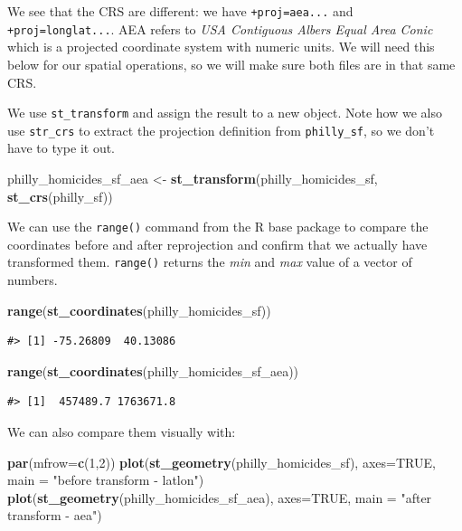 \documentclass[
]{book}
\newenvironment{Shaded}{\begin{snugshade}}{\end{snugshade}}
\newcommand{\AttributeTok}[1]{\textcolor[rgb]{0.13,0.29,0.53}{#1}}
\newcommand{\ConstantTok}[1]{\textcolor[rgb]{0.56,0.35,0.01}{#1}}
\newcommand{\DecValTok}[1]{\textcolor[rgb]{0.00,0.00,0.81}{#1}}
\newcommand{\FunctionTok}[1]{\textcolor[rgb]{0.13,0.29,0.53}{\textbf{#1}}}
\newcommand{\NormalTok}[1]{#1}
\newcommand{\OtherTok}[1]{\textcolor[rgb]{0.56,0.35,0.01}{#1}}
\newcommand{\StringTok}[1]{\textcolor[rgb]{0.31,0.60,0.02}{#1}}
\begin{document}
We see that the CRS are different: we have \texttt{+proj=aea...} and \texttt{+proj=longlat...}. AEA refers to \emph{USA Contiguous Albers Equal Area Conic} which is a projected coordinate system with numeric units. We will need this below for our spatial operations, so we will make sure both files are in that same CRS.

We use \texttt{st\_transform} and assign the result to a new object. Note how we also use \texttt{str\_crs} to extract the projection definition from \texttt{philly\_sf}, so we don't have to type it out.

\begin{Shaded}
\begin{Highlighting}[]
\NormalTok{philly\_homicides\_sf\_aea }\OtherTok{\textless{}{-}} \FunctionTok{st\_transform}\NormalTok{(philly\_homicides\_sf, }\FunctionTok{st\_crs}\NormalTok{(philly\_sf))}
\end{Highlighting}
\end{Shaded}

We can use the \texttt{range()} command from the R base package to compare the coordinates before and after reprojection and confirm that we actually have transformed them. \texttt{range()} returns the \emph{min} and \emph{max} value of a vector of numbers.

\begin{Shaded}
\begin{Highlighting}[]
\FunctionTok{range}\NormalTok{(}\FunctionTok{st\_coordinates}\NormalTok{(philly\_homicides\_sf))}
\end{Highlighting}
\end{Shaded}

\begin{verbatim}
#> [1] -75.26809  40.13086
\end{verbatim}

\begin{Shaded}
\begin{Highlighting}[]
\FunctionTok{range}\NormalTok{(}\FunctionTok{st\_coordinates}\NormalTok{(philly\_homicides\_sf\_aea))}
\end{Highlighting}
\end{Shaded}

\begin{verbatim}
#> [1]  457489.7 1763671.8
\end{verbatim}

We can also compare them visually with:

\begin{Shaded}
\begin{Highlighting}[]
\FunctionTok{par}\NormalTok{(}\AttributeTok{mfrow=}\FunctionTok{c}\NormalTok{(}\DecValTok{1}\NormalTok{,}\DecValTok{2}\NormalTok{)) }
\FunctionTok{plot}\NormalTok{(}\FunctionTok{st\_geometry}\NormalTok{(philly\_homicides\_sf), }\AttributeTok{axes=}\ConstantTok{TRUE}\NormalTok{, }\AttributeTok{main =} \StringTok{"before transform {-} latlon"}\NormalTok{)}
\FunctionTok{plot}\NormalTok{(}\FunctionTok{st\_geometry}\NormalTok{(philly\_homicides\_sf\_aea), }\AttributeTok{axes=}\ConstantTok{TRUE}\NormalTok{, }\AttributeTok{main =} \StringTok{"after transform {-} aea"}\NormalTok{)}
\end{Highlighting}
\end{Shaded}
\end{document}

